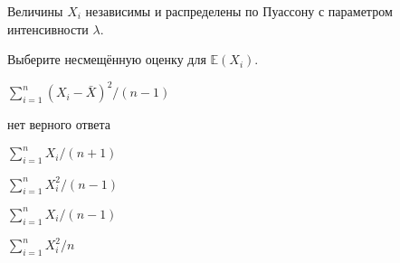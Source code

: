 
\begin{question}
Величины \(X_i\) независимы и распределены по Пуассону с параметром
интенсивности \(\lambda\).

Выберите несмещённую оценку для \(\mathbb{E}(X_i)\).
\begin{answerlist}
  \item \(\sum_{i=1}^n (X_i - \bar X)^2 / (n - 1)\)
  \item нет верного ответа
  \item \(\sum_{i=1}^n X_i / (n + 1)\)
  \item \(\sum_{i=1}^n X_i^2 / (n - 1)\)
  \item \(\sum_{i=1}^n X_i / (n - 1)\)
  \item \(\sum_{i=1}^n X_i^2 / n\)
\end{answerlist}
\end{question}


